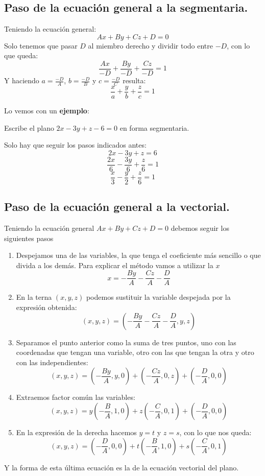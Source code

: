 \documentclass[a4paper,11pt,answers]{exam}
\begin{document}
\subsection{Paso de la ecuación general a la segmentaria.}
Teniendo la ecuación general:
\[Ax + By + Cz + D = 0\]
Solo tenemos que pasar $D$ al miembro derecho y dividir todo entre $-D$, con lo que queda:
\[\frac{Ax}{-D} + \frac{By}{-D} + \frac{Cz}{-D} = 1\]
Y haciendo $a = \frac{-D}{A}$, $b = \frac{-D}{B}$ y $c = \frac{-D}{C}$ resulta:
\[\frac{x}{a} + \frac{y}{b} + \frac{z}{c} = 1\]

Lo vemos con un \textbf{ejemplo}:\\
\begin{questions}
\question Escribe el plano $2x - 3y + z - 6=0$ en forma segmentaria.
\begin{solution}
	Solo hay que seguir los pasos indicados antes:
	\[2x - 3y + z = 6\]
	\[\frac{2x}{6} - \frac{3y}{6} + \frac{z}{6} = 1\]
	\[\frac{x}{3} - \frac{y}{2} + \frac{z}{6} = 1\]
\end{solution}
\end{questions}
\subsection{Paso de la ecuación general a la vectorial.}
Teniendo la ecuación general $Ax + By + Cz +D = 0$ debemos seguir los siguientes pasos
\begin{enumerate}
	\item Despejamos una de las variables, la que tenga el coeficiente más sencillo o que divida a los demás. Para explicar el método vamos a utilizar la $x$
	\[x = -\frac{By}{A} - \frac{Cz}{A} - \frac{D}{A}\]
	\item En la terna $(x, y, z)$ podemos sustituir la variable despejada por la expresión obtenida:
	\[(x, y , z) = \left(-\frac{By}{A} - \frac{Cz}{A} - \frac{D}{A}, y, z\right)\]
	\item Separamos el punto anterior como la suma de tres puntos, uno con las coordenadas que tengan una variable, otro con las que tengan la otra y otro con las independientes:
	\[(x, y , z) = \left(-\frac{By}{A}, y, 0\right) +\left(-\frac{Cz}{A}, 0, z\right) +\left(- \frac{D}{A}, 0, 0\right)\]
	\item Extraemos factor común las variables:
	\[(x, y , z) = y\left(-\frac{B}{A}, 1, 0\right) +z\left(-\frac{C}{A}, 0, 1\right)+ \left(- \frac{D}{A}, 0, 0\right)\]
	\item En la expresión de la derecha hacemos $y=t$ y $z=s$, con lo que nos queda:
	\[(x, y , z) = \left(- \frac{D}{A}, 0, 0\right) + t \left(-\frac{B}{A}, 1, 0\right)+ s\left(-\frac{C}{A}, 0, 1\right) \]
\end{enumerate}
Y la forma de esta última ecuación es la de la ecuación vectorial del plano.\\
\end{document}

